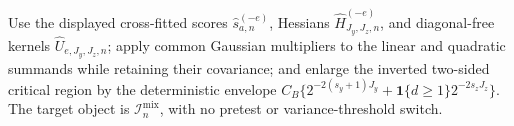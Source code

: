 Use the displayed cross-fitted scores \(\widehat s_{a,n}^{(-e)}\), Hessians \(\widehat H_{J_y,J_z,n}^{(-e)}\), and diagonal-free kernels \(\widehat U_{e,J_y,J_z,n}\); apply common Gaussian multipliers to the linear and quadratic summands while retaining their covariance; and enlarge the inverted two-sided critical region by the deterministic envelope \(C_B\{2^{-2(s_y+1)J_y}+\mathbf 1\{d\ge1\}2^{-2s_zJ_z}\}\). The target object is \(\mathcal I_n^{\mathrm{mix}}\), with no pretest or variance-threshold switch.